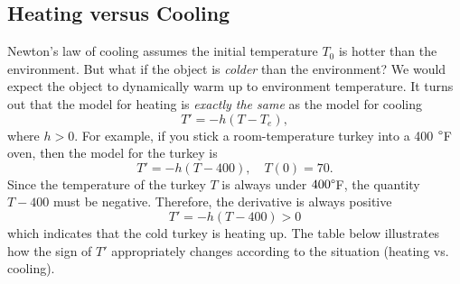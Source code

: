 \documentclass[09pt,letterpaper]{article}
\begin{document}




\subsection{Heating versus Cooling}

Newton's law of cooling assumes the initial temperature $T_0$ is hotter than the environment. But what if the object is \textit{colder} than the environment? We would expect the object to dynamically warm up to environment temperature. It turns out that the model for heating is \textit{exactly the same} as the model for cooling
\[
T' = -h(T - T_e),
\]
where $h>0$. For example, if you stick a room-temperature turkey into a 400 $\degree$F oven, then the model for the turkey is 
$$
T' = -h(T-400), \quad T(0)=70.
$$
Since the temperature of the turkey $T$ is always under $400\degree$F, the quantity $T-400$ must be negative. Therefore, the derivative is always positive
$$
T'=-h(T-400) > 0
$$
which indicates that the cold turkey is heating up. The table below illustrates how the sign of $T'$ appropriately changes according to the situation (heating vs. cooling).
\end{document}
